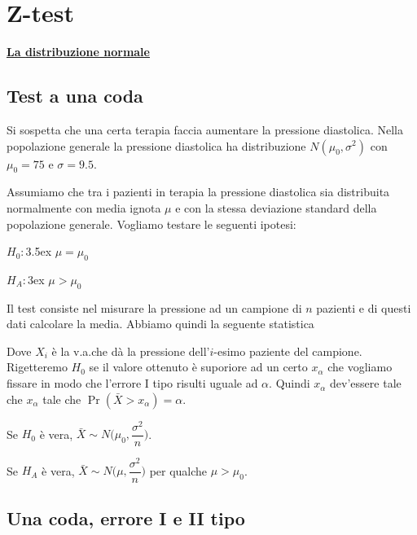 \documentclass[12pt,openany]{book}
\theoremstyle{mio}
\theoremstyle{liscio}
\begin{document}
\section{Z-test}
\label{Z-test}
\hfill\textbf{{\color{brown}\hyperref[distribuzione normale]{La distribuzione normale \faShare}}}
\subsection{Test a una coda}
Si sospetta che una certa terapia faccia aumentare la pressione diastolica. Nella popolazione generale la pressione diastolica ha distribuzione $N(\mu_0,\sigma^2)$ con $\mu_0=75$ e $\sigma=9.5$. 

Assumiamo che tra i pazienti in terapia la pressione diastolica sia distribuita normalmente con media ignota $\mu$ e con la stessa deviazione standard della popolazione generale. Vogliamo testare le seguenti ipotesi:

$H_0:$\kern3.5ex $\mu=\mu_0$

$H_A:$\kern3ex $\mu>\mu_0$

Il test consiste nel misurare la pressione ad un campione di $n$ pazienti e di questi dati calcolare la media. Abbiamo quindi la seguente statistica


Dove $X_i$ è la v.a.\@ che dà la pressione dell'$i$-esimo paziente del campione. Rigetteremo $H_0$ se il
valore ottenuto è suporiore ad un certo $x_\alpha$ che vogliamo fissare in modo che l'errore I tipo risulti uguale ad $\alpha$. Quindi $x_\alpha$ dev'essere tale che $x_\alpha$ tale che $\Pr(\bar X>x_\alpha)=\alpha$.

Se $H_0$ è vera, $\bar X\sim N\bigg(\mu_0,\dfrac{\sigma^2}{n}\bigg)$.

Se $H_A$ è vera, $\bar X\sim N\bigg(\mu,\dfrac{\sigma^2}{n}\bigg)$ per qualche $\mu>\mu_0$.

% 



\hfill{}\clearpage\subsection{Una coda, errore I e II tipo}
\end{document}
